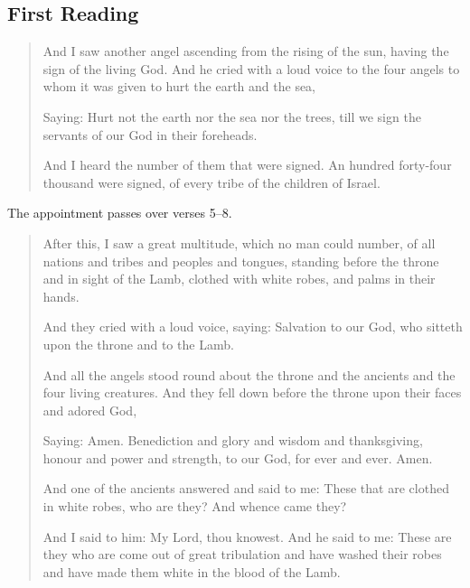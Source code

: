 \subsection{First Reading}
\label{proper-first-reading}
\begin{quote}
And I saw another angel ascending from the rising of the sun, having the sign of the living God. And he cried with a loud voice to the four angels to whom it was given to hurt the earth and the sea,

Saying: Hurt not the earth nor the sea nor the trees, till we sign the servants of our God in their foreheads.

And I heard the number of them that were signed. An hundred forty-four thousand were signed, of every tribe of the children of Israel.
\end{quote}
The appointment passes over verses 5--8.
\begin{quote}
After this, I saw a great multitude, which no man could number, of all nations and tribes and peoples and tongues, standing before the throne and in sight of the Lamb, clothed with white robes, and palms in their hands.

And they cried with a loud voice, saying: Salvation to our God, who sitteth upon the throne and to the Lamb.

And all the angels stood round about the throne and the ancients and the four living creatures. And they fell down before the throne upon their faces and adored God,

Saying: Amen. Benediction and glory and wisdom and thanksgiving, honour and power and strength, to our God, for ever and ever. Amen.

And one of the ancients answered and said to me: These that are clothed in white robes, who are they? And whence came they?

And I said to him: My Lord, thou knowest. And he said to me: These are they who are come out of great tribulation and have washed their robes and have made them white in the blood of the Lamb.
\end{quote}

